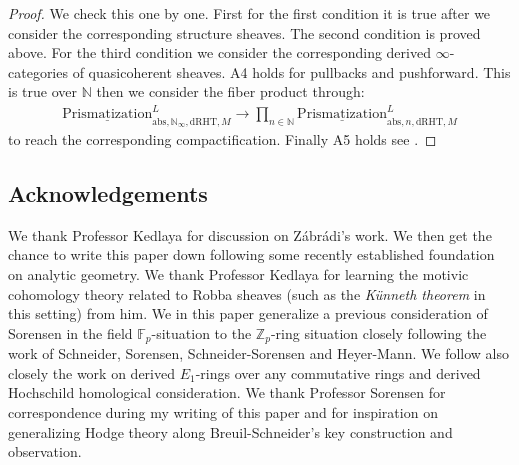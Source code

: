 \documentclass[12pt]{article}
\theoremstyle{definition}
\begin{document}
\begin{proof}
We check this one by one. First for the first condition it is true after we consider the corresponding structure sheaves. The second condition is proved above. For the third condition we consider the corresponding derived $\infty$-categories of quasicoherent sheaves. A4 holds for pullbacks and pushforward. This is true over $\mathbb{N}$ then we consider the fiber product through:
\begin{align}
{\underline{\mathrm{Prismatization}}}^L_{\mathrm{abs},\mathbb{N}_\infty,\mathrm{dRHT},M}\rightarrow  \prod_{n\in \mathbb{N}} {\underline{\mathrm{Prismatization}}}^L_{\mathrm{abs},n,\mathrm{dRHT},M}
\end{align}
to reach the corresponding compactification. Finally A5 holds see \cite[Chapter 4, in particular 4.7, 4.8, 4.9, 4.10]{3A}.
\end{proof}















\newpage
\subsection*{Acknowledgements}

We thank Professor Kedlaya for discussion on Z\'abr\'adi's work. We then get the chance to write this paper down following some recently established foundation on analytic geometry. We thank Professor Kedlaya for learning the motivic cohomology theory related to Robba sheaves (such as the \textit{K\"unneth theorem} in this setting) from him. We in this paper generalize a previous consideration of Sorensen in the field $\mathbb{F}_p$-situation to the $\mathbb{Z}_p$-ring situation closely following the work of Schneider, Sorensen, Schneider-Sorensen and Heyer-Mann. We follow also closely the work \cite{Sa} on derived $E_1$-rings over any commutative rings and derived Hochschild homological consideration. We thank Professor Sorensen for correspondence during my writing of this paper and for inspiration on generalizing Hodge theory along Breuil-Schneider's key construction and observation. 
\end{document}
